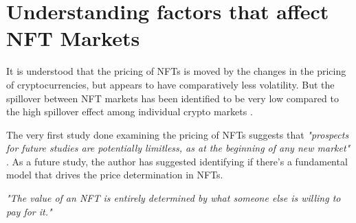 \documentclass[a4paper, 12pt, oneside]{report}
\begin{document}


\section{Understanding factors that affect NFT Markets}
It is understood that the pricing of NFTs is moved by the changes in the pricing of cryptocurrencies, but appears to have comparatively less volatility. But the spillover between NFT markets has been identified to be very low compared to the high spillover effect among individual crypto markets \autocite{dowling_is_2021}.

The very first study done examining the pricing of NFTs suggests that \emph{"prospects for future studies are potentially limitless, as at the beginning of any new market"} \autocite{dowling_fertile_2021}. As a future study, the author has suggested identifying if there's a fundamental model that drives the price determination in NFTs.





\emph{"The value of an NFT is entirely determined by what someone else is willing to pay for it."} \autocite{conti_what_2021}
\end{document}
